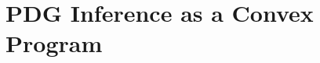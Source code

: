 \documentclass{article}
\newcommand\discard[1]{}
\begin{document}
\discard{\color{gray!80!white}
    \section{AN EXPRESSIVE CLASS OF OPTIMIZATION PROBLMS}

    \begin{itemize}
        \item
        Many optimization problems can be effectively solved with
    \end{itemize}

    \begin{itemize}
        \item
        For optimization people: a new class of optimization problems,
    \end{itemize}

}

\section{PDG Inference as a Convex Program}
    \label{sec:inf-as-cvx-program}
\end{document}
